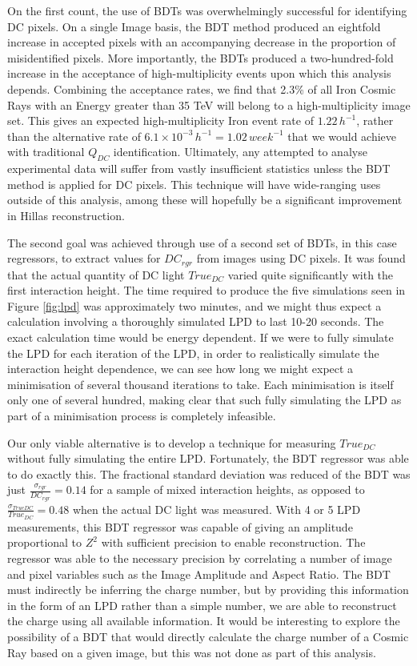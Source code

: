\documentclass[11pt]{article}
\begin{document}
On the first count, the use of BDTs was overwhelmingly successful for identifying DC pixels. On a single Image basis, the BDT method produced an eightfold increase in accepted pixels with an accompanying decrease in the proportion of misidentified pixels. More importantly, the BDTs produced a two-hundred-fold increase in the acceptance of high-multiplicity events upon which this analysis depends. Combining the acceptance rates, we find that 2.3\% of all Iron Cosmic Rays with an Energy greater than 35 TeV will belong to a high-multiplicity image set. This gives an expected high-multiplicity Iron event rate of $1.22 \, h^{-1}$, rather than the alternative rate of $6.1 \times 10 ^{-3} \, h^{-1}= 1.02 \, week^{-1}$ that we would achieve with traditional $Q_{DC}$ identification. Ultimately, any attempted to analyse experimental data will suffer from vastly insufficient statistics unless the BDT method is applied for DC pixels. This technique will have wide-ranging uses outside of this analysis, among these will hopefully be a significant improvement in Hillas reconstruction. 

The second goal was achieved through use of a second set of BDTs, in this case regressors, to extract values for $DC_{rgr}$ from images using DC pixels. It was found that the actual quantity of DC light $True_{DC}$ varied quite significantly with the first interaction height. The time required to produce the five simulations seen in Figure \ref{fig:lpd} was approximately two minutes, and we might thus expect a calculation involving a thoroughly simulated LPD to last 10-20 seconds. The exact calculation time would be energy dependent. If we were to fully simulate the LPD for each iteration of the LPD, in order to realistically simulate the interaction height dependence,  we can see how long we might expect a minimisation of several thousand iterations to take. Each minimisation is itself only one of several hundred, making clear that such  fully simulating the LPD as part of a minimisation process is completely infeasible. 

Our only viable alternative is to develop a technique for measuring $True_{DC}$ without fully simulating the entire LPD. Fortunately, the BDT regressor was able to  do exactly this. The fractional standard deviation was reduced of the BDT was just $\frac{\sigma_{rgr}}{DC_{rgr}} = 0.14$ for a sample of mixed interaction heights, as opposed to $\frac{\sigma_{TrueDC}}{True_{DC}} = 0.48$ when the actual DC light was measured. With 4 or 5 LPD measurements, this BDT regressor was capable of giving an amplitude proportional to $Z^{2}$ with sufficient precision to enable reconstruction. The regressor was able to the necessary precision by correlating a number of image and pixel variables such as the Image Amplitude and Aspect Ratio. The BDT must indirectly be inferring the charge number, but by providing this information in the form of an LPD rather than a simple number, we are able to reconstruct the charge using all available information. It would be interesting to explore the possibility of a BDT that would directly calculate the charge number of a Cosmic Ray based on a given image, but this was not done as part of this analysis.
\end{document}
